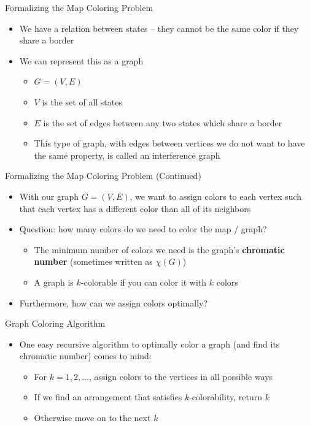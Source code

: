 \documentclass[aspectratio=169]{beamer}
\begin{document}
\begin{frame}{Formalizing the Map Coloring Problem}
    \begin{itemize}
        \item We have a relation between states -- they cannot be the same color if they share a border
        \item We can represent this as a graph
        \pause
        \begin{itemize}
            \item $G = (V, E)$
            \item $V$ is the set of all states
            \item $E$ is the set of edges between any two states which share a border
            \item This type of graph, with edges between vertices we do not want to have the same property, is called an interference graph
        \end{itemize}
    \end{itemize}
\end{frame}

\begin{frame}{Formalizing the Map Coloring Problem (Continued)}
    \begin{itemize}
        \item With our graph $G = (V, E)$, we want to assign colors to each vertex such that each vertex has a different color than all of its neighbors
        \pause
        \item Question: how many colors do we need to color the map / graph?
        \pause
        \begin{itemize}
            \item The minimum number of colors we need is the graph's \textbf{chromatic number} (sometimes written as $\chi(G)$)
            \item A graph is $k$-colorable if you can color it with $k$ colors
        \end{itemize}
        \pause
        \item Furthermore, how can we assign colors optimally?
    \end{itemize}
\end{frame}

\begin{frame}{Graph Coloring Algorithm}
    \begin{itemize}
        \item One easy recursive algorithm to optimally color a graph (and find its chromatic number) comes to mind:
        \begin{itemize}
            \item For $k = 1, 2, \ldots$, assign colors to the vertices in all possible ways
            \item If we find an arrangement that satisfies $k$-colorability, return $k$
            \item Otherwise move on to the next $k$
        \end{itemize}
    \end{itemize}
\end{frame}
\end{document}
